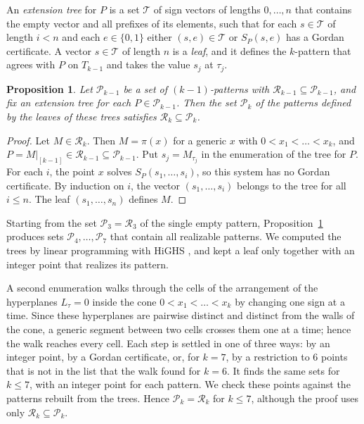 \documentclass[11pt]{amsart}
\newtheorem{proposition}[theorem]{Proposition}
\theoremstyle{definition}
\theoremstyle{remark}
\numberwithin{equation}{section}
\newcommand{\cR}{\mathcal{R}}
\newcommand{\cP}{\mathcal{P}}
\newcommand{\cT}{\mathcal{T}}
\begin{document}
An \emph{extension tree} for $P$ is a set $\cT$ of sign vectors of lengths $0,\dots,n$ that contains the empty vector and all prefixes of its elements, such that for each $s\in\cT$ of length $i<n$ and each $e\in\{0,1\}$ either $(s,e)\in\cT$ or $S_P(s,e)$ has a Gordan certificate. A vector $s\in\cT$ of length $n$ is a \emph{leaf}, and it defines the $k$-pattern that agrees with $P$ on $T_{k-1}$ and takes the value $s_j$ at $\tau_j$.

\begin{proposition}\label{prop:complete}
Let $\cP_{k-1}$ be a set of $(k-1)$-patterns with $\cR_{k-1}\subseteq\cP_{k-1}$, and fix an extension tree for each $P\in\cP_{k-1}$. Then the set $\cP_k$ of the patterns defined by the leaves of these trees satisfies $\cR_k\subseteq\cP_k$.
\end{proposition}

\begin{proof}
Let $M\in\cR_k$. Then $M=\pi(x)$ for a generic $x$ with $0<x_1<\dots<x_k$, and $P=M|_{[k-1]}\in\cR_{k-1}\subseteq\cP_{k-1}$. Put $s_j=M_{\tau_j}$ in the enumeration of the tree for $P$. For each $i$, the point $x$ solves $S_P(s_1,\dots,s_i)$, so this system has no Gordan certificate. By induction on $i$, the vector $(s_1,\dots,s_i)$ belongs to the tree for all $i\le n$. The leaf $(s_1,\dots,s_n)$ defines $M$.
\end{proof}

Starting from the set $\cP_3=\cR_3$ of the single empty pattern, Proposition~\ref{prop:complete} produces sets $\cP_4,\dots,\cP_7$ that contain all realizable patterns. We computed the trees by linear programming with HiGHS \cite{HiGHS}, and kept a leaf only together with an integer point that realizes its pattern.

A second enumeration walks through the cells of the arrangement of the hyperplanes $L_\tau=0$ inside the cone $0<x_1<\dots<x_k$ by changing one sign at a time. Since these hyperplanes are pairwise distinct and distinct from the walls of the cone, a generic segment between two cells crosses them one at a time; hence the walk reaches every cell. Each step is settled in one of three ways: by an integer point, by a Gordan certificate, or, for $k=7$, by a restriction to $6$ points that is not in the list that the walk found for $k=6$. It finds the same sets for $k\le7$, with an integer point for each pattern. We check these points against the patterns rebuilt from the trees. Hence $\cP_k=\cR_k$ for $k\le7$, although the proof uses only $\cR_k\subseteq\cP_k$.
\end{document}
